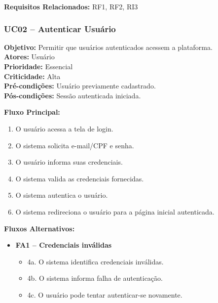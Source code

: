 \documentclass[
	article,			%
	11pt,				%
	oneside,			%
	a4paper,			%
	english,			%
	brazil,				%
	sumario=tradicional
	]{abntex2}
\begin{document}
\vspace{0.5em}
\noindent\textbf{Requisitos Relacionados:} RF1, RF2, RI3


\subsubsection{UC02 – Autenticar Usuário}
\label{uc:02}
\noindent\textbf{Objetivo:} Permitir que usuários autenticados acessem a plataforma.\\
\textbf{Atores:} Usuário\\
\textbf{Prioridade:} Essencial\\
\textbf{Criticidade:} Alta\\
\textbf{Pré-condições:} Usuário previamente cadastrado.\\
\textbf{Pós-condições:} Sessão autenticada iniciada.

\vspace{0.5em}
\noindent\textbf{Fluxo Principal:}
\begin{enumerate}[label=\arabic*.]
    \item O usuário acessa a tela de login.
    \item O sistema solicita e-mail/CPF e senha.
    \item O usuário informa suas credenciais.
    \item O sistema valida as credenciais fornecidas.
    \item O sistema autentica o usuário.
    \item O sistema redireciona o usuário para a página inicial autenticada.
\end{enumerate}

\vspace{0.5em}
\noindent\textbf{Fluxos Alternativos:}
\begin{itemize}[leftmargin=*]
    \item \textbf{FA1 – Credenciais inválidas}
    \begin{itemize}[label={}, leftmargin=0.5cm]
        \item 4a. O sistema identifica credenciais inválidas.
        \item 4b. O sistema informa falha de autenticação.
        \item 4c. O usuário pode tentar autenticar-se novamente.
    \end{itemize}
\end{itemize}
\end{document}
